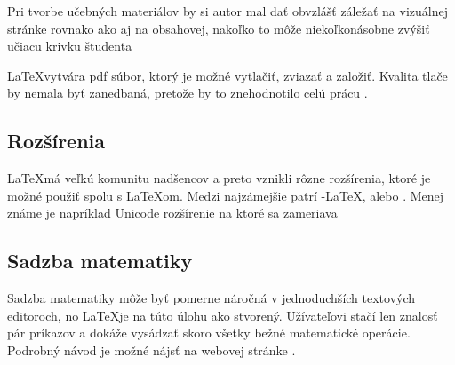 \documentclass[a4paper, 11pt]{article}
\begin{document}
Pri tvorbe učebných materiálov by si autor mal dať obvzlášť záležať na vizuálnej stránke rovnako ako aj na obsahovej, nakoľko to môže niekoľkonásobne zvýšiť učiacu krivku študenta \cite{article1948}

\LaTeX vytvára pdf súbor, ktorý je možné vytlačiť, zviazať a založiť. Kvalita tlače by nemala byť zanedbaná, pretože by to znehodnotilo celú prácu \cite{article2013}. 

\subsection{Rozšírenia}
\LaTeX má veľkú komunitu nadšencov a preto vznikli rôzne rozšírenia, ktoré je možné použiť spolu s \LaTeX om. Medzi najzámejšie patrí \AmS-\LaTeX, \BibTeX alebo \MiKTeX. Menej známe je napríklad Unicode rozšírenie \XeTeX na ktoré sa zameriava \cite{kocur2016}

\subsection{Sadzba matematiky}
Sadzba matematiky môže byť pomerne náročná v jednoduchších textových editoroch, no \LaTeX je na túto úlohu ako stvorený. Užívateľovi stačí len znalosť pár príkazov a dokáže vysádzať skoro všetky bežné matematické operácie. Podrobný návod je možné nájsť na webovej stránke \cite{online2009}.

\newpage

\renewcommand{\refname}{Literatura}

\end{document}
